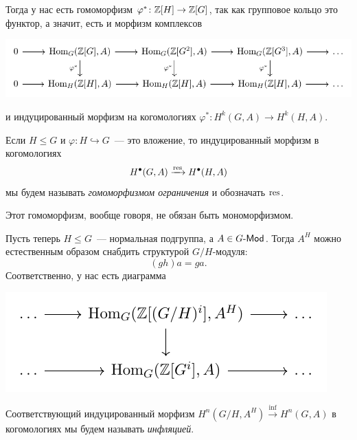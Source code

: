 	 Тогда у нас есть гомоморфизм $\varphi^*\colon \mathbb{Z}[H] \to \mathbb{Z}[G]$, так как групповое кольцо это функтор, а значит, есть и морфизм комплексов 

	 \begin{center}
	 	\includegraphics{lectures/6/pictures/cd_8.pdf}
	 \end{center}

	 и индуцированный морфизм на когомологиях $\varphi^*\colon H^k(G, A) \to H^k(H, A)$. 

	 \begin{definition} 
	 	Если $H \le G$ и $\varphi \colon H \hookrightarrow G$~--- это вложение, то индуцированный морфизм в когомологиях 
	 	\[
	 		H^{\bullet}(G, A) \xrightarrow{\operatorname{res}} H^{\bullet}(H, A)
	 	\]
	 	мы будем называть \emph{гомоморфизмом ограничения} и обозначать $\operatorname{res}$. 
	 \end{definition}

	 \begin{remark}
	 	Этот гомоморфизм, вообще говоря, не обязан быть мономорфизмом. 
	 \end{remark}


	 Пусть теперь $H \le G$~--- нормальная подгруппа, а $A \in G\text{-}\mathsf{Mod}$. Тогда $A^H$ можно естественным образом снабдить структурой $G/H$-модуля: 
	 \[
	 	(gh)a = ga.
	 \]
	 Соответственно, у нас есть диаграмма 
	 \begin{center}
	 	\includegraphics{lectures/6/pictures/cd_9.pdf}
	 \end{center}

	 \begin{definition} 
	 	Соответствующий индуцированный морфизм $H^{n}(G/H, A^H) \xrightarrow{\inf} H^n(G, A)$ в когомологиях мы будем называть \emph{инфляцией}.
	 \end{definition}

